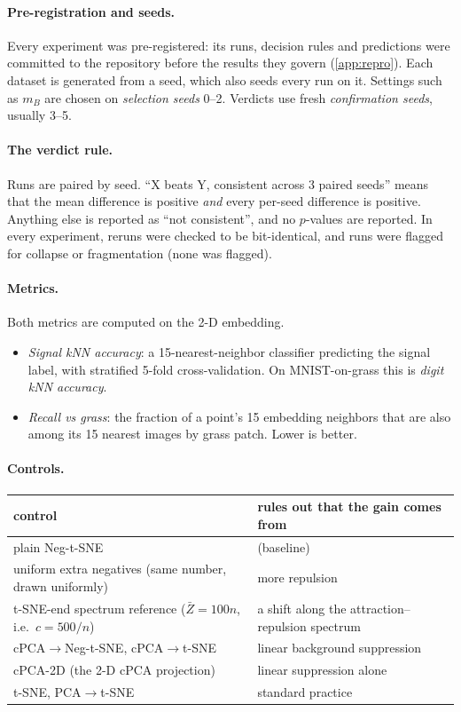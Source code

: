 \documentclass[10pt]{article}
\begin{document}
\paragraph{Pre-registration and seeds.} Every experiment was pre-registered: its runs, decision rules and predictions were committed to the repository before the results they govern (\cref{app:repro}). Each dataset is generated from a seed, which also seeds every run on it. Settings such as $m_B$ are chosen on \emph{selection seeds} 0--2. Verdicts use fresh \emph{confirmation seeds}, usually 3--5.

\paragraph{The verdict rule.} Runs are paired by seed. ``X beats Y, consistent across 3 paired seeds'' means that the mean difference is positive \emph{and} every per-seed difference is positive. Anything else is reported as ``not consistent'', and no $p$-values are reported. In every experiment, reruns were checked to be bit-identical, and runs were flagged for collapse or fragmentation (none was flagged).

\paragraph{Metrics.} Both metrics are computed on the 2-D embedding.
\begin{itemize}
  \item \emph{Signal kNN accuracy}: a 15-nearest-neighbor classifier predicting the signal label, with stratified 5-fold cross-validation. On MNIST-on-grass this is \emph{digit kNN accuracy}.
  \item \emph{Recall vs grass}: the fraction of a point's 15 embedding neighbors that are also among its 15 nearest images by grass patch. Lower is better.
\end{itemize}

\paragraph{Controls.}
\begin{center}
\small
\begin{tabular}{ll}
  \toprule
  control & rules out that the gain comes from \\
  \midrule
  plain Neg-t-SNE & (baseline) \\
  uniform extra negatives (same number, drawn uniformly) & more repulsion \\
  t-SNE-end spectrum reference ($\bar Z = 100n$, i.e.\ $c = 500/n$) & a shift along the attraction--repulsion spectrum \\
  cPCA$\to$Neg-t-SNE, cPCA$\to$t-SNE & linear background suppression \\
  cPCA-2D (the 2-D cPCA projection) & linear suppression alone \\
  t-SNE, PCA$\to$t-SNE & standard practice \\
  \bottomrule
\end{tabular}
\end{center}
\end{document}
